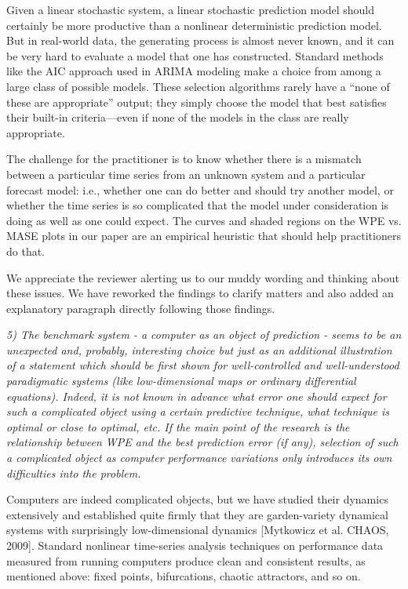 \documentclass[12pt]{article}
\begin{document}
Given a linear stochastic system, a linear stochastic prediction model
should certainly be more productive than a nonlinear deterministic
prediction model.  But in real-world data, the generating process is
almost never known, and it can be very hard to evaluate a model that
one has constructed.  Standard methods like the AIC approach used in
ARIMA modeling make a choice from among a large class of possible
models.  These selection algorithms rarely have a ``none of these are
appropriate'' output; they simply choose the model that best satisfies
their built-in criteria---even if none of the models in the class are
really appropriate.

The challenge for the practitioner is to know whether there is a
mismatch between a particular time series from an unknown system and a
particular forecast model: i.e., whether one can do better and should
try another model, or whether the time series is so complicated that
the model under consideration is doing as well as one could expect.
The curves and shaded regions on the WPE vs. MASE plots in our paper
are an empirical heuristic that should help practitioners do that.

We appreciate the reviewer alerting us to our muddy wording and
thinking about these issues.  We have reworked the findings to clarify
matters and also added an explanatory paragraph directly following
those findings.  

\smallskip

\emph{5) The benchmark system - a computer as an object of prediction
  - seems to be an unexpected and, probably, interesting choice but
  just as an additional illustration of a statement which should be
  first shown for well-controlled and well-understood paradigmatic
  systems (like low-dimensional maps or ordinary differential
  equations). Indeed, it is not known in advance what error one should
  expect for such a complicated object using a certain predictive
  technique, what technique is optimal or close to optimal, etc. If
  the main point of the research is the relationship between WPE and
  the best prediction error (if any), selection of such a complicated
  object as computer performance variations only introduces its own
  difficulties into the problem.}

Computers are indeed complicated objects, but we have studied their
dynamics extensively and established quite firmly that they are
garden-variety dynamical systems with surprisingly low-dimensional
dynamics [Mytkowicz et al. CHAOS, 2009].  Standard nonlinear
time-series analysis techniques on performance data measured from
running computers produce clean and consistent results, as mentioned
above: fixed points, bifurcations, chaotic attractors, and so on.
\end{document}
